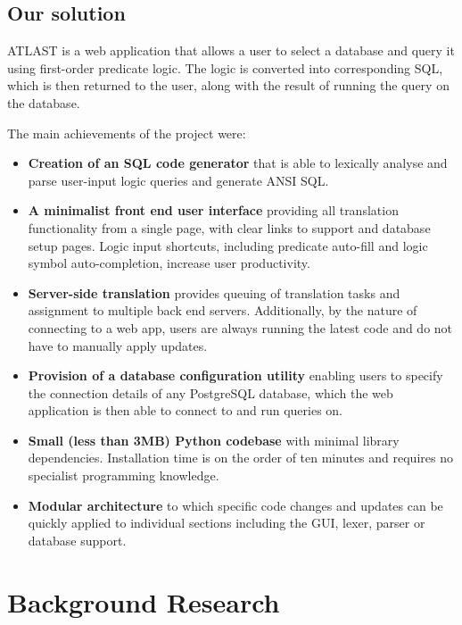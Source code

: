 \documentclass[a4paper, 11pt]{article}
\begin{document}
  \subsection{Our solution}
    ATLAST is a web application that allows a user to select a database
    and query it using first-order predicate logic. The logic is converted
    into corresponding SQL, which is then returned to the user, along with the
    result of running the query on the database.

    The main achievements of the project were:

    \begin{itemize}
      \item \textbf{Creation of an SQL code generator} that is able to lexically
      analyse and parse user-input logic queries and generate ANSI SQL.

      \item \textbf{A minimalist front end user interface} providing all
      translation functionality from a single page, with clear links to
      support and database setup pages. Logic input shortcuts, including
      predicate auto-fill and logic symbol auto-completion, increase user
      productivity.

      \item \textbf{Server-side translation} provides queuing of translation
      tasks and assignment to multiple back end servers. Additionally, by the
      nature of connecting to a web app, users are always running the latest
      code and do not have to manually apply updates.

      \item \textbf{Provision of a database configuration utility} enabling
      users to specify the connection details of any PostgreSQL database, which
      the web application is then able to connect to and run queries on.

      \item \textbf{Small (less than 3MB) Python codebase} with minimal
      library dependencies. Installation time is on the order of ten minutes
      and requires no specialist programming knowledge.

      \item \textbf{Modular architecture} to which specific code changes
      and updates can be quickly applied to individual sections including the
      GUI, lexer, parser or database support.
    \end{itemize}

\section{Background Research}
  \label{sec:background}
\end{document}
